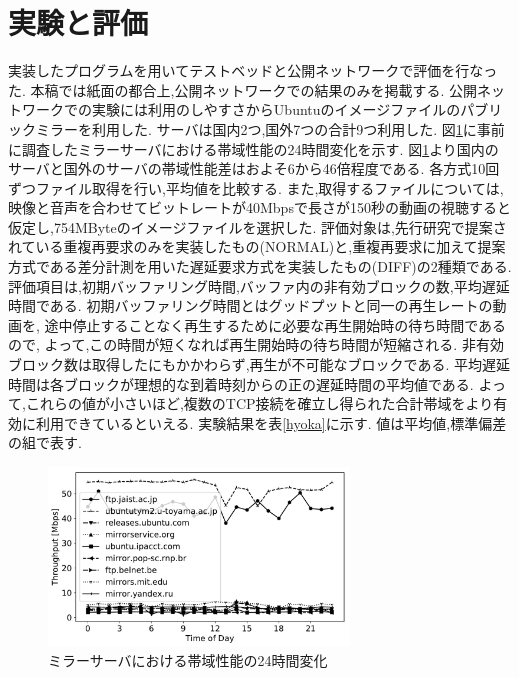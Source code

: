 \documentclass{ltjsarticle}
\begin{document}
\section{実験と評価}
\vspace{-3mm}
実装したプログラムを用いてテストベッドと公開ネットワークで評価を行なった.
本稿では紙面の都合上,公開ネットワークでの結果のみを掲載する.
公開ネットワークでの実験には利用のしやすさからUbuntuのイメージファイルのパブリックミラーを利用した.
サーバは国内2つ,国外7つの合計9つ利用した.
図\ref{mirror}に事前に調査したミラーサーバにおける帯域性能の24時間変化を示す.
図\ref{mirror}より国内のサーバと国外のサーバの帯域性能差はおよそ6から46倍程度である.
各方式10回ずつファイル取得を行い,平均値を比較する.
また,取得するファイルについては,映像と音声を合わせてビットレートが40Mbpsで長さが150秒の動画の視聴すると仮定し,754MByteのイメージファイルを選択した.
評価対象は,先行研究で提案されている重複再要求のみを実装したもの(NORMAL)と,重複再要求に加えて提案方式である差分計測を用いた遅延要求方式を実装したもの(DIFF)の2種類である.
評価項目は,初期バッファリング時間,バッファ内の非有効ブロックの数,平均遅延時間である.
初期バッファリング時間とはグッドプットと同一の再生レートの動画を,
途中停止することなく再生するために必要な再生開始時の待ち時間であるので,
よって,この時間が短くなれば再生開始時の待ち時間が短縮される.
非有効ブロック数は取得したにもかかわらず,再生が不可能なブロックである.
平均遅延時間は各ブロックが理想的な到着時刻からの正の遅延時間の平均値である.
よって,これらの値が小さいほど,複数のTCP接続を確立し得られた合計帯域をより有効に利用できているといえる.
実験結果を表\ref{hyoka}に示す.
値は平均値,標準偏差の組で表す.
\vspace{-8mm}
\begin{table}[htb]
	\begin{center}
		\caption{実験結果}
		\label{hyoka}
		\vspace{-3.5mm}
	\end{center}
\end{table}
\vspace{-11mm}
\begin{figure}[h]
	\centering
	\includegraphics[width=8cm]{figure/thp24h-g.pdf}
	\vspace{-5.5mm}
	\caption{ミラーサーバにおける帯域性能の24時間変化}
	\label{mirror}
\end{figure}
\end{document}
